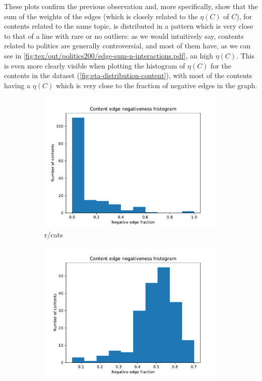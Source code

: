 These plots confirm the previous observation and, more specifically, show that
the sum of the weights of the edges (which is closely related
to the $\eta(C)$ of $C$), for contents related to the same topic, is distributed
in a pattern which is very close to that of a line with rare or no outliers: as
we would intuitively say, contents related to politics are generally
controversial, and most of them have, as we can see in \autoref{fig:tex/out/politics200/edge-sum-n-interactions.pdf}, an high $\eta(C)$.
This is even more clearly visible when plotting the histogram of $\eta(C)$ for the contents in the dataset
(\autoref{fig:eta-distribution-content}), with most of the contents having a
$\eta(C)$ which is very close to the fraction of negative edges in the graph.

\begin{figure}
	\begin{center}
		\begin{subfigure}[b]{0.4\textwidth}
			\centering
			\includegraphics[width=\textwidth]{tex/out/cats200/neg-fraction-content-hist.pdf}
			\caption{r/cats}
			\label{fig:tex/out/cats200/neg-fraction-content-hist.pdf}
		\end{subfigure}
		\begin{subfigure}[b]{0.4\textwidth}
			\centering
			\includegraphics[width=\textwidth]{tex/out/asktrumpsupporters200/neg-fraction-content-hist.pdf}

\end{subfigure}
\end{center}
\end{figure}
